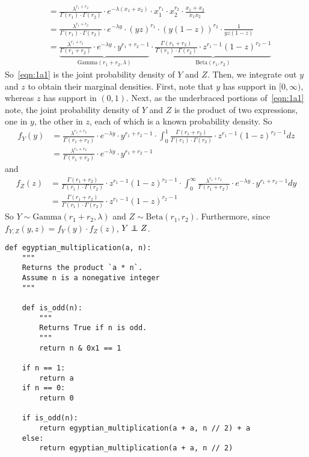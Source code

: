 \documentclass[10pt]{extarticle}
\begin{document}
\begin{ans}
\begin{align}
                       &= \frac{\lambda^{r_1 + r_2}}{\Gamma(r_1) \cdot \Gamma(r_2)} \cdot e^{-\lambda(x_1 + x_2)} \cdot x_1^{r_1} \cdot x_2^{r_2} \cdot \frac{x_1 + x_2}{x_1 x_2} \\
                       &= \frac{\lambda^{r_1 + r_2}}{\Gamma(r_1) \cdot \Gamma(r_2)} \cdot e^{-\lambda y} \cdot (yz)^{r_1} \cdot (y(1 -z))^{r_2} \cdot \frac{1}{yz(1-z)} \\
                       &= \underbrace{\frac{\lambda^{r_1 + r_2}}{\Gamma(r_1 + r_2)} \cdot e^{-\lambda y} \cdot y^{r_1 + r_2 - 1}}_{\text{Gamma}(r_1 + r_2, \lambda)} \cdot \underbrace{\frac{\Gamma(r_1 + r_2)}{\Gamma(r_1) \cdot \Gamma(r_2)} \cdot z^{r_1 - 1} (1 - z)^{r_2 - 1}}_{\text{Beta}(r_1, r_2)} \label{eqn:1a1}
    \end{align}
    So~\ref{eqn:1a1} is the joint probability density of $Y$ and $Z$. Then, we integrate out $y$ and $z$ to obtain their marginal densities. First, note that $y$ has support in $[0, \infty)$, whereas $z$ has support in $(0, 1)$. Next, as the underbraced portions of~\ref{eqn:1a1} note, the joint probability density of $Y$ and $Z$ is the product of two expressions, one in $y$, the other in $z$, each of which is a known probability density. So
    \begin{align}
        f_Y(y) &= \frac{\lambda^{r_1 + r_2}}{\Gamma(r_1 + r_2)} \cdot e^{-\lambda y} \cdot y^{r_1 + r_2 - 1} \cdot \int_0^1 \frac{\Gamma(r_1 + r_2)}{\Gamma(r_1) \cdot \Gamma(r_2)} \cdot z^{r_1 - 1} (1 - z)^{r_2 - 1} dz \\
               &= \frac{\lambda^{r_1 + r_2}}{\Gamma(r_1 + r_2)} \cdot e^{-\lambda y} \cdot y^{r_1 + r_2 - 1}
    \end{align}
    and
    \begin{align}
        f_Z(z) &= \frac{\Gamma(r_1 + r_2)}{\Gamma(r_1) \cdot \Gamma(r_2)} \cdot z^{r_1 - 1} (1 - z)^{r_2 - 1} \cdot \int_0^\infty \frac{\lambda^{r_1 + r_2}}{\Gamma(r_1 + r_2)} \cdot e^{-\lambda y} \cdot y^{r_1 + r_2 - 1} dy \\
               &= \frac{\Gamma(r_1 + r_2)}{\Gamma(r_1) \cdot \Gamma(r_2)} \cdot z^{r_1 - 1} (1 - z)^{r_2 - 1}
    \end{align}
    So $Y \sim \text{Gamma}(r_1 + r_2, \lambda)$ and $Z \sim \text{Beta}(r_1, r_2)$. Furthermore, since $f_{Y, Z}(y, z) = f_{Y}(y) \cdot f_Z(z)$, $Y \perp \!\!\!\! \perp Z$.
\end{ans}

\begin{verbatim}
def egyptian_multiplication(a, n):
    """
    Returns the product `a * n`.
    Assume n is a nonegative integer
    """

    def is_odd(n):
        """
        Returns True if n is odd.
        """
        return n & 0x1 == 1

    if n == 1:
        return a
    if n == 0:
        return 0

    if is_odd(n):
        return egyptian_multiplication(a + a, n // 2) + a
    else:
        return egyptian_multiplication(a + a, n // 2)
\end{verbatim}
\end{document}

